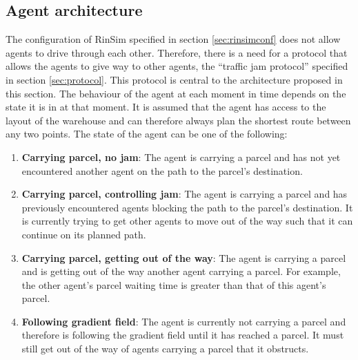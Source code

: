 \subsection{Agent architecture}\label{sec:agentarch}
The configuration of RinSim specified in section \ref{sec:rinsimconf} does not allow agents to drive through each other. Therefore, there is a need for a protocol that allows the agents to give way to other agents, the ``traffic jam protocol'' specified in section \ref{sec:protocol}. This protocol is central to the architecture proposed in this section. The behaviour of the agent at each moment in time depends on the state it is in at that moment. It is assumed that the agent has access to the layout of the warehouse and can therefore always plan the shortest route between any two points. The state of the agent can be one of the following:
\begin{enumerate}
\item \textbf{Carrying parcel, no jam}: The agent is carrying a parcel and has not yet encountered another agent on the path to the parcel's destination.
\item \textbf{Carrying parcel, controlling jam}: The agent is carrying a parcel and has previously encountered agents blocking the path to the parcel's destination. It is currently trying to get other agents to move out of the way such that it can continue on its planned path.
\item \textbf{Carrying parcel, getting out of the way}: The agent is carrying a parcel and is getting out of the way another agent carrying a parcel. For example, the other agent's parcel waiting time is greater than that of this agent's parcel.
\item \textbf{Following gradient field}: The agent is currently not carrying a parcel and therefore is following the gradient field until it has reached a parcel. It must still get out of the way of agents carrying a parcel that it obstructs.
\end{enumerate}

